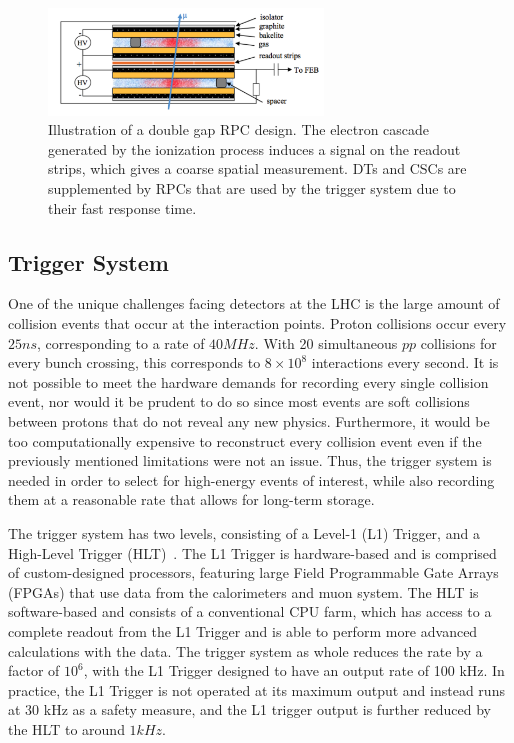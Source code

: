 \begin{figure}[htbp]
  \centering
  \includegraphics[width=0.65\textwidth]{fig/experiment/rpc_schema.pdf}
  \caption{
    Illustration of a double gap RPC design.
    The electron cascade generated by the ionization process induces a signal on the readout strips, which gives a coarse spatial measurement.
    DTs and CSCs are supplemented by RPCs that are used by the trigger system due to their fast response time.
  }
  \label{fig:CMSRPC}
\end{figure}

\subsection{Trigger System}
\label{subsec:trigger}

One of the unique challenges facing detectors at the LHC is the large amount of collision events that occur at the interaction points.
Proton collisions occur every $25\unit{ns}$, corresponding to a rate of $40\unit{MHz}$.
With 20 simultaneous $pp$ collisions for every bunch crossing, this corresponds to $8\times10^8$ interactions every second.
It is not possible to meet the hardware demands for recording every single collision event, nor would it be prudent to do so since most events are soft collisions between protons that do not reveal any new physics.
Furthermore, it would be too computationally expensive to reconstruct every collision event even if the previously mentioned limitations were not an issue.
Thus, the trigger system is needed in order to select for high-energy events of interest, while also recording them at a reasonable rate that allows for long-term storage.

The trigger system has two levels, consisting of a Level-1 (L1) Trigger, and a High-Level Trigger (HLT)~\cite{CMStrigger}.
The L1 Trigger is hardware-based and is comprised of custom-designed processors, featuring large Field Programmable Gate Arrays (FPGAs) that use data from the calorimeters and muon system.
The HLT is software-based and consists of a conventional CPU farm, which has access to a complete readout from the L1 Trigger and is able to perform more advanced calculations with the data.
The trigger system as whole reduces the rate by a factor of $10^6$, with the L1 Trigger designed to have an output rate of 100 kHz.
In practice, the L1 Trigger is not operated at its maximum output and instead runs at 30 kHz as a safety measure, and the L1 trigger output is further reduced by the HLT to around $1\unit{kHz}$.

